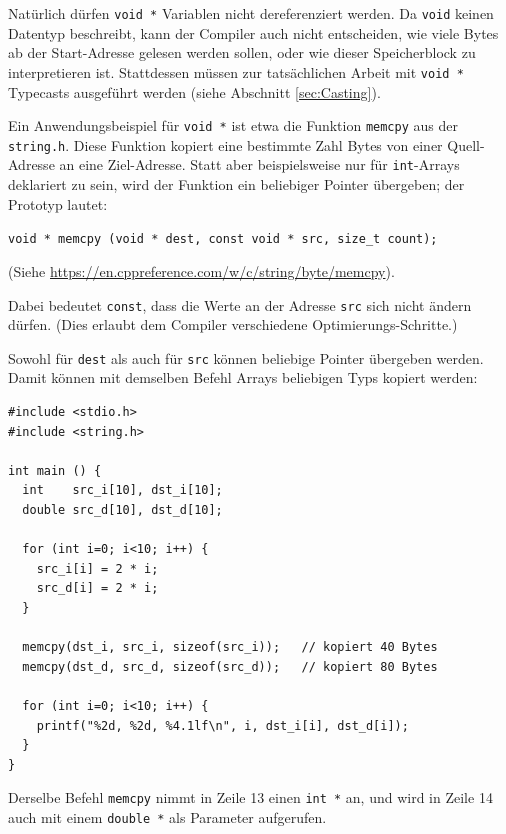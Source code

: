 Natürlich dürfen \texttt{void *} Variablen nicht dereferenziert werden. Da \texttt{void} keinen Datentyp beschreibt, kann der Compiler auch nicht entscheiden, wie viele Bytes ab der Start-Adresse gelesen werden sollen, oder wie dieser Speicherblock zu interpretieren ist. Stattdessen müssen zur tatsächlichen Arbeit mit \texttt{void *} Typecasts ausgeführt werden (siehe Abschnitt \ref{sec:Casting}).

Ein Anwendungsbeispiel für \texttt{void *} ist etwa die Funktion \texttt{memcpy} aus der \texttt{string.h}. Diese Funktion kopiert eine bestimmte Zahl Bytes von einer Quell-Adresse an eine Ziel-Adresse. Statt aber beispielsweise nur für \texttt{int}-Arrays deklariert zu sein, wird der Funktion ein beliebiger Pointer übergeben; der Prototyp lautet:

\begin{center}
\texttt{void * memcpy (void * dest, const void * src, size_t count);}
\end{center}

(Siehe \url{https://en.cppreference.com/w/c/string/byte/memcpy}).

Dabei bedeutet \texttt{const}, dass die Werte an der Adresse \texttt{src} sich nicht ändern dürfen. (Dies erlaubt dem Compiler verschiedene Optimierungs-Schritte.)

Sowohl für \texttt{dest} als auch für \texttt{src} können beliebige Pointer übergeben werden. Damit können mit demselben Befehl Arrays beliebigen Typs kopiert werden:

\begin{codebox}
\begin{verbatim}
#include <stdio.h>
#include <string.h>

int main () {
  int    src_i[10], dst_i[10];
  double src_d[10], dst_d[10];

  for (int i=0; i<10; i++) {
    src_i[i] = 2 * i;
    src_d[i] = 2 * i;
  }

  memcpy(dst_i, src_i, sizeof(src_i));   // kopiert 40 Bytes
  memcpy(dst_d, src_d, sizeof(src_d));   // kopiert 80 Bytes

  for (int i=0; i<10; i++) {
    printf("%2d, %2d, %4.1lf\n", i, dst_i[i], dst_d[i]);
  }
}
\end{verbatim}
\end{codebox}

Derselbe Befehl \texttt{memcpy} nimmt in Zeile 13 einen \texttt{int *} an, und wird in Zeile 14 auch mit einem \texttt{double *} als Parameter aufgerufen.


